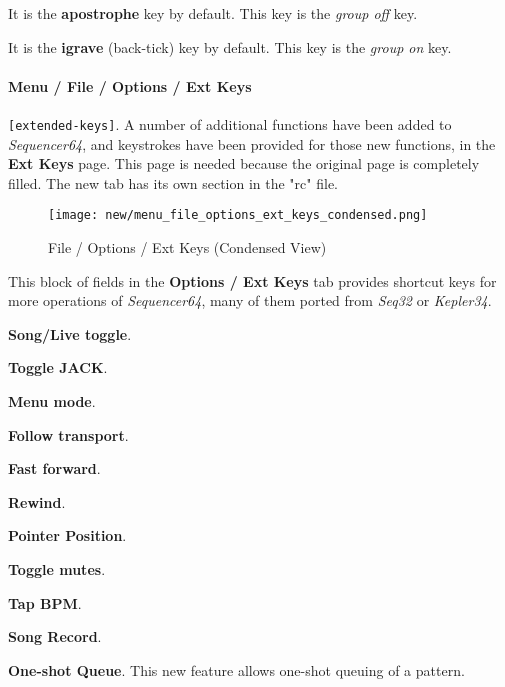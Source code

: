    It is the \textbf{apostrophe} key by default.
   This key is the \textsl{group off} key.

   It is the \textbf{igrave} (back-tick) key by default.
   This key is the \textsl{group on} key.

\paragraph{Menu / File / Options / Ext Keys }
\label{paragraph:seq64_menu_file_options_ext_keys}

   \texttt{[extended-keys]}.
   A number of additional functions have been added to \textsl{Sequencer64},
   and keystrokes have been provided for those new functions, in the
   \textbf{Ext Keys} page.  This page is needed because the original page is
   completely filled.  The new tab has its own section in the "rc" file.

\begin{figure}[H]
   \centering 
   \texttt{[image: new/menu\_file\_options\_ext\_keys\_condensed.png]}
   \caption{File / Options / Ext Keys (Condensed View)}
   \label{fig:seq64_menu_file_options_ext_keys}
\end{figure}


   \setcounter{ItemCounter}{0}      %

   This block of fields in the \textbf{Options / Ext Keys} tab
   provides shortcut keys for more operations of \textsl{Sequencer64}, many of
   them ported from \textsl{Seq32} or \textsl{Kepler34}.

   \begin{enumber}
      \item \textbf{Song/Live toggle}.
      \item \textbf{Toggle JACK}.
      \item \textbf{Menu mode}.
      \item \textbf{Follow transport}.
      \item \textbf{Fast forward}.
      \item \textbf{Rewind}.
      \item \textbf{Pointer Position}.
      \item \textbf{Toggle mutes}.
      \item \textbf{Tap BPM}.
      \item \textbf{Song Record}.
      \item \textbf{One-shot Queue}.
         This new feature allows one-shot queuing of a pattern.
   \end{enumber}

